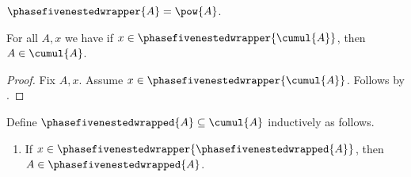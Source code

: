 \begin{abbreviation}\label{phase5_nested_wrapper}
    $\phasefivenestedwrapper{A}=\pow{A}$.
\end{abbreviation}

\begin{proposition}\label{phase5_nested_wrapper_guard}
    For all $A, x$ we have if
        $x\in\phasefivenestedwrapper{\cumul{A}}$, then
        $A\in\cumul{A}$.
\end{proposition}
\begin{proof}
    Fix $A, x$.
    Assume $x\in\phasefivenestedwrapper{\cumul{A}}$.
    Follows by \auto.
\end{proof}

\begin{inductive}\label{phase5_nested_wrapper_inductive}
    Define $\phasefivenestedwrapped{A}\subseteq\cumul{A}$ inductively as follows.
    \begin{enumerate}
        \item If
            $x\in\phasefivenestedwrapper{\phasefivenestedwrapped{A}}$, then
            $A\in\phasefivenestedwrapped{A}$.
    \end{enumerate}
\end{inductive}
